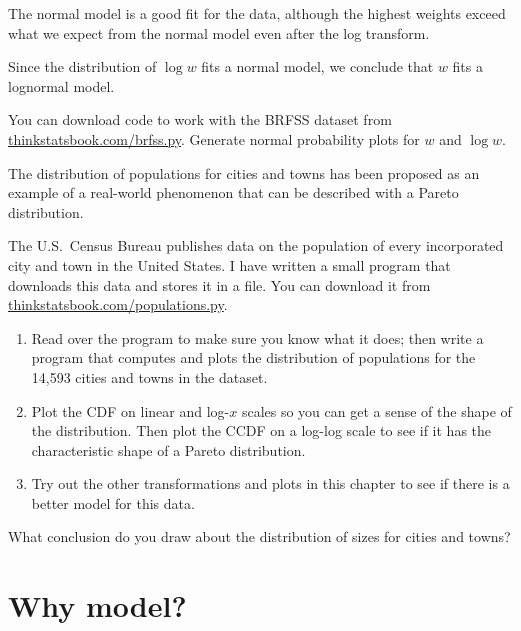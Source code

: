 \documentclass[12pt]{book}
\begin{document}
The normal model is a good fit for the data, although the
highest weights exceed what we expect from the normal model even after
the log transform.

Since the distribution of $\log w$ fits a normal model, we conclude that 
$w$ fits a lognormal model.

\begin{ex}

You can download code to work with the BRFSS dataset from
\url{thinkstatsbook.com/brfss.py}.  Generate normal probability plots
  for $w$ and $\log w$.

\end{ex}

\begin{ex}

The distribution of populations for cities and towns has been proposed
as an example of a real-world phenomenon that can be described
with a Pareto distribution.

The U.S.~Census Bureau publishes data on the population of every
incorporated city and town in the United States.  I have written a
small program that downloads this data and stores it in a file.  You
can download it from \url{thinkstatsbook.com/populations.py}.

\begin{enumerate}

\item Read over the program to make sure you know what it does; then
  write a program that computes and plots the distribution of
  populations for the 14,593 cities and towns in the dataset.

\item Plot the CDF on linear and log-$x$ scales so you can get a sense
  of the shape of the distribution.  Then plot the CCDF on a log-log
  scale to see if it has the characteristic shape of a Pareto
  distribution.

\item Try out the other transformations and plots in this chapter to
  see if there is a better model for this data.

\end{enumerate}

What conclusion do you draw about the distribution of sizes
for cities and towns?

\end{ex}


\section{Why model?}
\end{document}
